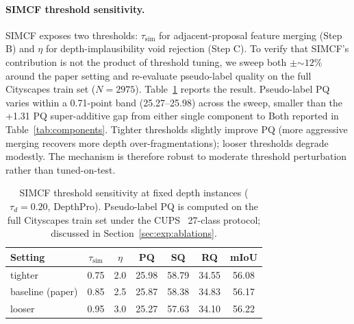\documentclass[10pt,twocolumn,letterpaper]{article}
\begin{document}
\paragraph{SIMCF threshold sensitivity.}
SIMCF exposes two thresholds: $\tau_\text{sim}$ for adjacent-proposal feature merging (Step B) and $\eta$ for depth-implausibility void rejection (Step C). To verify that SIMCF's contribution is not the product of threshold tuning, we sweep both $\pm$$\sim$$12\%$ around the paper setting and re-evaluate pseudo-label quality on the full Cityscapes train set ($N=2975$). Table~\ref{tab:simcf_sensitivity} reports the result. Pseudo-label PQ varies within a 0.71-point band (25.27--25.98) across the sweep, smaller than the +1.31 PQ super-additive gap from either single component to Both reported in Table~\ref{tab:components}. Tighter thresholds slightly improve PQ (more aggressive merging recovers more depth over-fragmentations); looser thresholds degrade modestly. The mechanism is therefore robust to moderate threshold perturbation rather than tuned-on-test.

\begin{table}[t]
\centering
\small
\setlength{\tabcolsep}{3pt}
\begin{tabular}{l c c c c c c}
\toprule
Setting & $\tau_\text{sim}$ & $\eta$ & PQ & SQ & RQ & mIoU \\
\midrule
tighter         & 0.75 & 2.0 & 25.98 & 58.79 & 34.55 & 56.08 \\
baseline (paper) & 0.85 & 2.5 & 25.87 & 58.38 & 34.83 & 56.17 \\
looser          & 0.95 & 3.0 & 25.27 & 57.63 & 34.10 & 56.22 \\
\bottomrule
\end{tabular}
\caption{SIMCF threshold sensitivity at fixed depth instances ($\tau_d=0.20$, DepthPro). Pseudo-label PQ is computed on the full Cityscapes train set under the CUPS~\cite{hahn2025cups} 27-class protocol; discussed in Section~\ref{sec:exp:ablations}.}
\label{tab:simcf_sensitivity}
\end{table}
\end{document}
